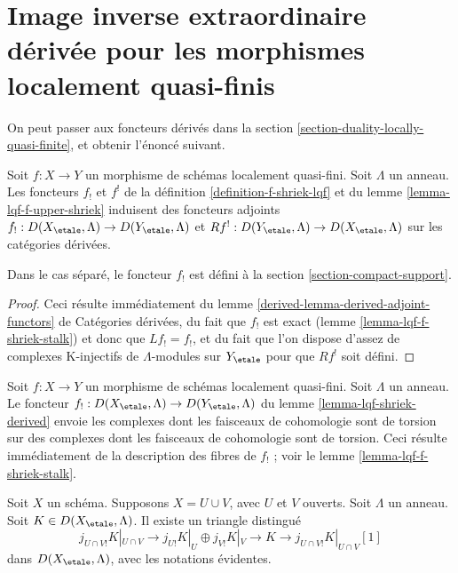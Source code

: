 \section{Image inverse extraordinaire dérivée pour les morphismes localement quasi-finis}
\label{section-derived-duality-locally-quasi-finite}

\noindent
On peut passer aux foncteurs dérivés dans la
section \ref{section-duality-locally-quasi-finite},
et obtenir l'énoncé suivant.

\begin{lemma}
\label{lemma-lqf-shriek-derived}
Soit $f : X \to Y$ un morphisme de schémas localement quasi-fini.
Soit $\Lambda$ un anneau. Les foncteurs $f_!$ et $f^!$ de la
définition \ref{definition-f-shriek-lqf} et du
lemme \ref{lemma-lqf-f-upper-shriek}
induisent des foncteurs adjoints $f_! : D(X_\etale, \Lambda) \to D(Y_\etale, \Lambda)$
et $Rf^! : D(Y_\etale, \Lambda) \to D(X_\etale, \Lambda)$
sur les catégories dérivées.
\end{lemma}

\noindent
Dans le cas séparé, le foncteur $f_!$ est défini à la
section \ref{section-compact-support}.

\begin{proof}
Ceci résulte immédiatement du
lemme \ref{derived-lemma-derived-adjoint-functors} de Catégories dérivées,
du fait que $f_!$ est exact (lemme \ref{lemma-lqf-f-shriek-stalk})
et donc que $Lf_! = f_!$,
et du fait que l'on dispose d'assez de complexes K-injectifs de $\Lambda$-modules
sur $Y_\etale$ pour que $Rf^!$ soit défini.
\end{proof}

\begin{remark}
\label{remark-lqf-shriek-derived-torsion}
Soit $f : X \to Y$ un morphisme de schémas localement quasi-fini. Soit
$\Lambda$ un anneau. Le foncteur
$f_! : D(X_\etale, \Lambda) \to D(Y_\etale, \Lambda)$ du
lemme \ref{lemma-lqf-shriek-derived}
envoie les complexes dont les faisceaux de cohomologie sont de torsion
sur des complexes dont les faisceaux de cohomologie sont de torsion.
Ceci résulte immédiatement de la description des fibres de $f_!$ ;
voir le lemme \ref{lemma-lqf-f-shriek-stalk}.
\end{remark}

\begin{lemma}
\label{lemma-mayer-vietoris-shriek}
Soit $X$ un schéma. Supposons $X = U \cup V$, avec $U$ et $V$ ouverts.
Soit $\Lambda$ un anneau. Soit $K \in D(X_\etale, \Lambda)$. Il existe
un triangle distingué
$$
j_{U \cap V!}K|_{U \cap V} \to
j_{U!}K|_U \oplus j_{V!}K|_V \to K \to 
j_{U \cap V!}K|_{U \cap V}[1]
$$
dans $D(X_\etale, \Lambda)$, avec les notations évidentes.
\end{lemma}

